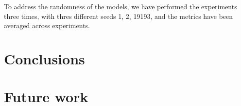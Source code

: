 \documentclass[12pt, a4paper]{report}
\begin{document}
To address the randomness of the models, we have performed the experiments three times, with thres different seeds 1, 2, 19193, and the metrics have been averaged across experiments.

\section{Conclusions}

\section{Future work}




\appendix





\end{document}
